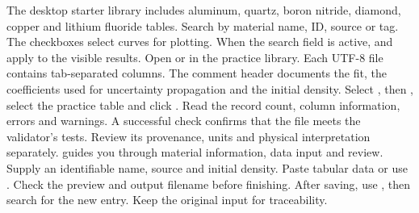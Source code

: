 
The desktop starter library includes aluminum, quartz, boron nitride, diamond, copper and lithium fluoride tables. Search by material name, ID, source or tag. The checkboxes select curves for plotting. When the search field is active,  and  apply to the visible results.
Open  or  in the practice library. Each UTF-8 file contains tab-separated columns. The comment header documents the fit, the coefficients used for uncertainty propagation and the initial density.
Select , then , select the practice table and click . Read the record count, column information, errors and warnings. A successful check confirms that the file meets the validator's tests. Review its provenance, units and physical interpretation separately.
 guides you through material information, data input and review. Supply an identifiable name, source and initial density. Paste tabular data or use . Check the preview and output filename before finishing. After saving, use , then search for the new entry. Keep the original input for traceability.

